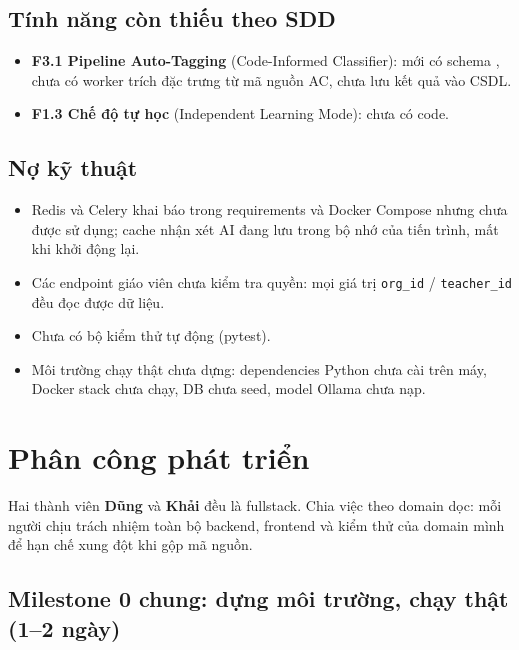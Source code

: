 \documentclass[11pt,a4paper]{article}
\begin{document}
\subsection{Tính năng còn thiếu theo SDD}

\begin{itemize}
    \item \textbf{F3.1 Pipeline Auto-Tagging} (Code-Informed Classifier): mới có schema , chưa có worker trích đặc trưng từ mã nguồn AC, chưa lưu kết quả vào CSDL.
    \item \textbf{F1.3 Chế độ tự học} (Independent Learning Mode): chưa có code.
\end{itemize}

\subsection{Nợ kỹ thuật}

\begin{itemize}
    \item Redis và Celery khai báo trong requirements và Docker Compose nhưng chưa được sử dụng; cache nhận xét AI đang lưu trong bộ nhớ của tiến trình, mất khi khởi động lại.
    \item Các endpoint giáo viên chưa kiểm tra quyền: mọi giá trị \texttt{org\_id} / \texttt{teacher\_id} đều đọc được dữ liệu.
    \item Chưa có bộ kiểm thử tự động (pytest).
    \item Môi trường chạy thật chưa dựng: dependencies Python chưa cài trên máy, Docker stack chưa chạy, DB chưa seed, model Ollama chưa nạp.
\end{itemize}



\section{Phân công phát triển}

Hai thành viên \textbf{Dũng} và \textbf{Khải} đều là fullstack. Chia việc theo domain dọc: mỗi người chịu trách nhiệm toàn bộ backend, frontend và kiểm thử của domain mình để hạn chế xung đột khi gộp mã nguồn.

\subsection{Milestone 0 chung: dựng môi trường, chạy thật (1--2 ngày)}
\end{document}
